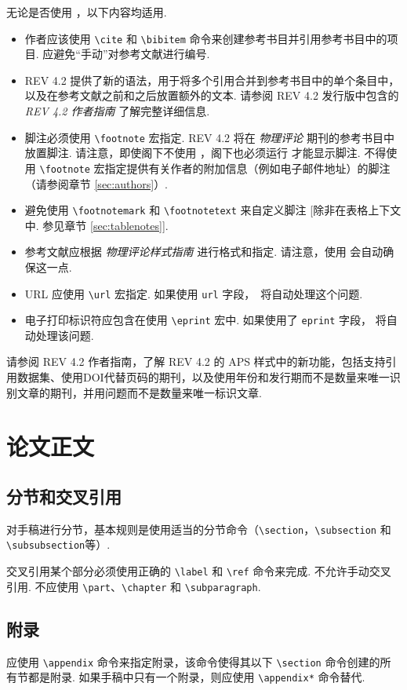 \documentclass[twocolumn, amssymb, bibnotes, aps, prd, 10pt]{revtex4-2}
\newcommand{\revtex}{REV\hologo{TeX}}
\newcommand{\macro}[1]{\texttt{\textbackslash#1}}
\newcommand{\m}[1]{\macro{#1}}
\begin{document}
无论是否使用 ，以下内容均适用.
\begin{itemize}
    \item 作者应该使用 \m{cite} 和 \m{bibitem} 命令来创建参考书目并引用参考书目中的项目. 应避免``手动''对参考文献进行编号.
    \item {\revtex} 4.2 提供了新的语法，用于将多个引用合并到参考书目中的单个条目中，以及在参考文献之前和之后放置额外的文本. 请参阅 {\revtex} 4.2 发行版中包含的 \textit{{\revtex} 4.2 作者指南} 了解完整详细信息.
    \item 脚注必须使用 \m{footnote} 宏指定. {\revtex} 4.2 将在 \textit{物理评论} 期刊的参考书目中放置脚注. 请注意，即使阁下不使用 ，阁下也必须运行  才能显示脚注. 不得使用 \m{footnote} 宏指定提供有关作者的附加信息（例如电子邮件地址）的脚注（请参阅章节 \ref{sec:authors}）.
    \item 避免使用 \m{footnotemark} 和 \m{footnotetext} 来自定义脚注 [除非在表格上下文中. 参见章节 \ref{sec:tablenotes}].
    \item 参考文献应根据 \textit{物理评论样式指南} 进行格式和指定. 请注意，使用  会自动确保这一点.
    \item URL 应使用 \m{url} 宏指定. 如果使用 \texttt{url} 字段，\ 将自动处理这个问题.
    \item 电子打印标识符应包含在使用 \m{eprint} 宏中. 如果使用了 \texttt{eprint} 字段， 将自动处理该问题.
\end{itemize}

请参阅 {\revtex} 4.2 作者指南，了解 {\revtex} 4.2 的 APS  样式中的新功能，包括支持引用数据集、使用DOI代替页码的期刊，以及使用年份和发行期而不是数量来唯一识别文章的期刊，并用问题而不是数量来唯一标识文章.

\section{论文正文}
\subsection{分节和交叉引用}
对手稿进行分节，基本规则是使用适当的分节命令（\m{section}，\m{subsection} 和 \m{subsubsection}等）.

交叉引用某个部分必须使用正确的 \m{label} 和 \m{ref} 命令来完成. 不允许手动交叉引用. 不应使用 \m{part}、\m{chapter} 和 \m{subparagraph}.

\subsection{附录}
应使用 \m{appendix} 命令来指定附录，该命令使得其以下 \m{section} 命令创建的所有节都是附录. 如果手稿中只有一个附录，则应使用 \m{appendix*} 命令替代.
\end{document}
